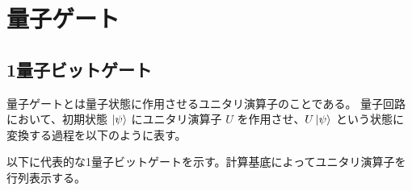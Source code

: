 

\section{量子ゲート}
\subsection{1量子ビットゲート}
量子ゲートとは量子状態に作用させるユニタリ演算子のことである。
量子回路において、初期状態 $\ket{\psi}$ にユニタリ演算子 $U$ を作用させ、$U\ket{\psi}$ という状態に変換する過程を以下のように表す。
\begin{figure}[H]
    \centering
\end{figure}

以下に代表的な1量子ビットゲートを示す。計算基底によってユニタリ演算子を行列表示する。


